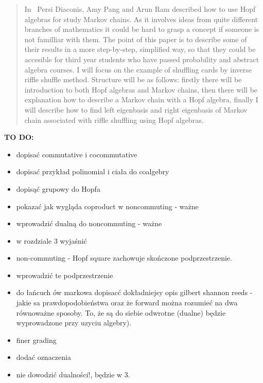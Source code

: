 \documentclass[a4paper, 12pt]{report}
\newcommand{\todo}[1]{\hfill \break \textbf{\Huge TO DO: #1 \hfill \break}\normalsize}
\begin{document}
\begin{abstract}

In~\cite{Diaconis2014} Persi Diaconis, Amy Pang and Arun Ram described how to use Hopf algebras for
study Markov chains. As it involves ideas from quite different branches of mathematics it could be hard to
grasp a concept if someone is not familliar with them.
The point of this paper is to describe some of their results in a more step-by-step, simplified way,
so that they could be accesible for third year students who have passed probability
and abstract algebra courses. I will focus on the example of shuffling cards by inverse riffle shuffle
method. Structure will be as follows: firstly there will be introduction to both Hopf algebras and Markov
chains, then there will be explanation how to describe a Markov chain with a Hopf algebra, finally I will
describe how to find left eigenbasis and right eigenbasis of Markov chain associated with riffle shuffling
using Hopf algebras.


\end{abstract}
\todo{}
\begin{itemize}
\item dopisać commutative i cocommutative
\item dopisać przykład polinomial i ciała do coalgebry
\item dopisąć grupowy do Hopfa
\item pokazać jak wygląda coproduct w noncommuting - ważne
\item wprowadzić dualną do noncommuting - ważne
\item w rozdziale 3 wyjaśnić
\item non-commuting - Hopf square zachowuje skończone podprzestrzenie.
\item wprowadzić te podprzestrzenie
\item do łańcuch ów markowa dopisacć dokładniejsy opis gilbert shannon reeds - jakie sa prawdopodobieństwa
oraz że forward można rozumieć na dwa równoważne sposoby. To, że są do siebie odwrotne (dualne) będzie
wyprowadzone przy uzyciu algebry).
\item finer grading
\item dodać oznaczenia
\item nie dowodzić dualności!, będzie w 3.
\end{itemize}
\end{document}

